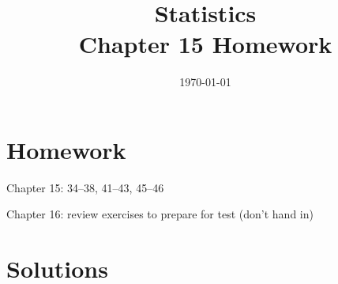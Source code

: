 \documentclass[letterpaper, landscape]{exam}
\title{Statistics \\ Chapter 15 Homework}
\date{\today}
\author{}
\begin{document}
  \maketitle

  \section{Homework}
  \begin{itemize*}
    \item Chapter 15: 34--38, 41--43, 45--46
    \item Chapter 16: review exercises to prepare for test (don't hand in)
  \end{itemize*}

  \ifprintanswers{}
    \section{Solutions}
\end{document}
